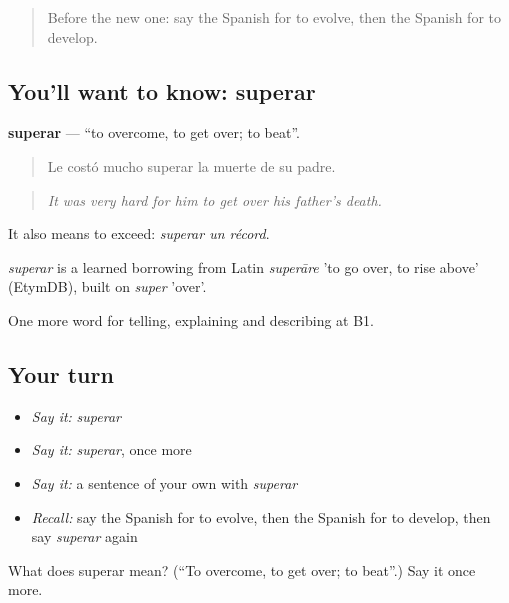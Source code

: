 \begin{quote}
Before the new one: say the Spanish for to evolve, then the Spanish for to develop.
\end{quote}

\subsection*{You'll want to know: superar}
\textbf{superar} — \textquotedblleft{}to overcome, to get over; to beat\textquotedblright{}.

\begin{quote}
Le costó mucho superar la muerte de su padre.
\end{quote}

\begin{quote}
\emph{It was very hard for him to get over his father's death.}
\end{quote}

It also means to exceed: \emph{superar un récord}.

\begin{cousinweb}
\emph{superar} is a learned borrowing from Latin \emph{superāre} 'to go over, to rise above' (EtymDB), built on \emph{super} 'over'.
\end{cousinweb}

\begin{grammarlens}[title={What you've built}]
One more word for telling, explaining and describing at B1.
\end{grammarlens}

\subsection*{Your turn}
\begin{itemize}
\raggedright
  \item \emph{Say it:} \emph{superar}
  \item \emph{Say it:} \emph{superar}, once more
  \item \emph{Say it:} a sentence of your own with \emph{superar}
  \item \emph{Recall:} say the Spanish for to evolve, then the Spanish for to develop, then say \emph{superar} again
\end{itemize}

\begin{tcolorbox}[breakable,colback=teal!4,colframe=teal!35!black,title={Before you move on}]
What does superar mean? (\textquotedblleft{}To overcome, to get over; to beat\textquotedblright{}.) Say it once more.
\end{tcolorbox}
